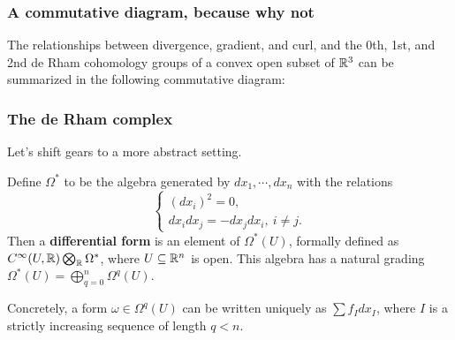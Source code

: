 \documentclass[xcolor=dvipsnames]{beamer}
\begin{document}
    \begin{frame}[fragile]
        \frametitle{A commutative diagram, because why not} 
        The relationships between divergence, gradient, and curl, and the 0th, 1st, and 2nd de Rham cohomology groups of a convex open subset of $\mathbb{R}^3$ can be summarized in the following commutative diagram:

        \begin{figure}[H]
        \end{figure}
    \end{frame}


    \begin{frame}
        \frametitle{The de Rham complex} 
        Let's shift gears to a more abstract setting.
        \begin{definition}
            Define $\Omega^*$ to be the algebra generated by $dx_1,\cdots ,dx_n $ with the relations \[
            \begin{cases}
                (dx_i )^2=0,\\
                dx_i dx_j =-dx_j dx_i ,\ i\neq j.
            \end{cases}
        \] Then a \textbf{differential form} is an element of $\Omega^*(U)$, formally defined as $C^{\infty}(U,\mathbb{R})\bigotimes _{\mathbb{R}}\Omega^*$, where $U \subseteq \mathbb{R}^n $ is open. This algebra has a natural grading $\Omega^*(U)=\bigoplus _{q=0}^n \Omega^q(U)$.
        \end{definition}%
    \begin{example}
        Concretely, a form $\omega \in  \Omega^q(U)$ can be written uniquely as $\sum f_I dx_I$, where $I$ is a strictly increasing sequence of length $q<n$.
    \end{example}
    \end{frame}
\end{document}
